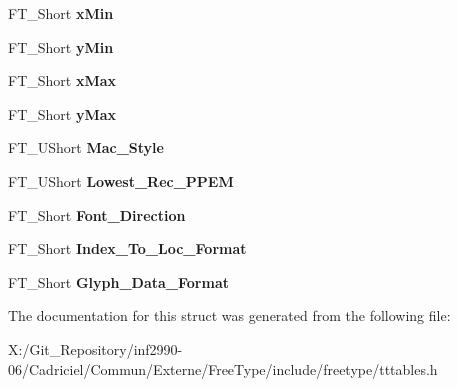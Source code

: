 \begin{DoxyCompactItemize}
\item 
\hypertarget{struct_t_t___header___ae4553d76427d9f7a28595ed71897dcbb}{F\-T\-\_\-\-Short {\bfseries x\-Min}}\label{struct_t_t___header___ae4553d76427d9f7a28595ed71897dcbb}

\item 
\hypertarget{struct_t_t___header___ac6aad4966bac8a96c5bc48765b3d694a}{F\-T\-\_\-\-Short {\bfseries y\-Min}}\label{struct_t_t___header___ac6aad4966bac8a96c5bc48765b3d694a}

\item 
\hypertarget{struct_t_t___header___a593b9cc3e11532972a7fc96944dd1ae9}{F\-T\-\_\-\-Short {\bfseries x\-Max}}\label{struct_t_t___header___a593b9cc3e11532972a7fc96944dd1ae9}

\item 
\hypertarget{struct_t_t___header___a02d236cd8150c00e886a0c487c04dffa}{F\-T\-\_\-\-Short {\bfseries y\-Max}}\label{struct_t_t___header___a02d236cd8150c00e886a0c487c04dffa}

\item 
\hypertarget{struct_t_t___header___a82f2a5a836b802e44ff712b3afc8745c}{F\-T\-\_\-\-U\-Short {\bfseries Mac\-\_\-\-Style}}\label{struct_t_t___header___a82f2a5a836b802e44ff712b3afc8745c}

\item 
\hypertarget{struct_t_t___header___a1d20801c3482dee2529d294441ed9af3}{F\-T\-\_\-\-U\-Short {\bfseries Lowest\-\_\-\-Rec\-\_\-\-P\-P\-E\-M}}\label{struct_t_t___header___a1d20801c3482dee2529d294441ed9af3}

\item 
\hypertarget{struct_t_t___header___a1cb7d8a2a76ae1acda3ac94bcd555954}{F\-T\-\_\-\-Short {\bfseries Font\-\_\-\-Direction}}\label{struct_t_t___header___a1cb7d8a2a76ae1acda3ac94bcd555954}

\item 
\hypertarget{struct_t_t___header___a05a488607bfae319de096b4bd9cf8c6d}{F\-T\-\_\-\-Short {\bfseries Index\-\_\-\-To\-\_\-\-Loc\-\_\-\-Format}}\label{struct_t_t___header___a05a488607bfae319de096b4bd9cf8c6d}

\item 
\hypertarget{struct_t_t___header___adeeedce4bb708c3e068ed80366ec921d}{F\-T\-\_\-\-Short {\bfseries Glyph\-\_\-\-Data\-\_\-\-Format}}\label{struct_t_t___header___adeeedce4bb708c3e068ed80366ec921d}

\end{DoxyCompactItemize}


The documentation for this struct was generated from the following file\-:\begin{DoxyCompactItemize}
\item 
X\-:/\-Git\-\_\-\-Repository/inf2990-\/06/\-Cadriciel/\-Commun/\-Externe/\-Free\-Type/include/freetype/tttables.\-h\end{DoxyCompactItemize}
